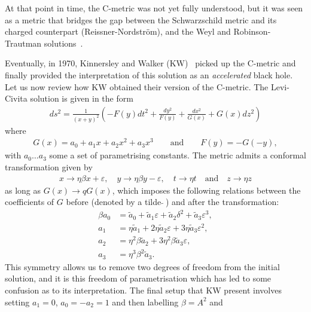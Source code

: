 \documentclass[
twoside,
openright,
frontopenright,
]{dmathesis}
\newcommand{\ta}{\tilde{a}}
\begin{document}
At that point in time, the C-metric was not yet fully understood, but it was
seen as a metric that bridges the gap between the Schwarzschild metric and its
charged counterpart (Reissner-Nordstr\"om), and the Weyl and Robinson-Trautman
solutions~\cite{Kinnersley:1970zw}.

Eventually, in 1970, Kinnersley and Walker (KW)~\cite{Kinnersley:1970zw} picked
up the C-metric and finally provided the interpretation of this solution as an
\emph{accelerated} black hole. Let us now review how KW obtained their version
of the C-metric. The Levi-Civita solution is given in the form
\begin{align}
  \label{eq:levi-civita-metric}
  ds^2 = \frac{1}{(x+y)^2} \left(-F(y)dt^2 + \frac{dy^2}{F(y)} + \frac{dx^2}{G(x)}
  + G(x) dz^2\right)
\end{align}
where
\begin{align}
  G(x) = a_0 + a_1 x + a_2 x^2 + a_3 x^3 \qquad \mbox{and} \qquad F(y) = -G(-y),
\end{align}
with $a_0\ldots a_3$ some a set of parametrising constants. The metric admits
a conformal transformation given by
\begin{gather}
  \label{eq:cmet-transf}
  x\to \eta\beta x + \varepsilon, \quad y \to \eta\beta y - \varepsilon, \quad t \to \eta t \quad \mbox{and} \quad
  z\to \eta z
\end{gather}
as long as $G(x) \to q G(x)$, which imposes the following relations between the
coefficients of $G$ before (denoted by a tilde $\tilde{}~$) and after the
transformation:
\begin{subequations}
  \label{eq:cmet-coef}
  \begin{align}
    \beta a_0 &= \ta_0 + \ta_1 \varepsilon+ \ta_ 2 \delta^2 + \ta_3 \varepsilon^3, \label{eq:cmet-coef1}\\
    a_1 &= \eta \ta_1 + 2\eta\ta_2 \varepsilon + 3 \eta\ta_3 \varepsilon^2, \label{eq:cmet-coef2}\\
    a_2 &= \eta^2\beta\ta_2 + 3 \eta^2\beta\ta_3\varepsilon, \label{eq:cmet-coef3}\\
    a_3 &= \eta^3\beta^2\ta_3.\label{eq:cmet-coef4}
  \end{align}
\end{subequations}
This symmetry allows us to remove two degrees of freedom from the initial
solution, and it is this freedom of parametrisation which has led to some
confusion as to its interpretation. The final setup that KW present involves
setting $a_1 = 0$, $a_0 = -a_2 = 1$ and then labelling $\beta = A^2$ and
\end{document}
